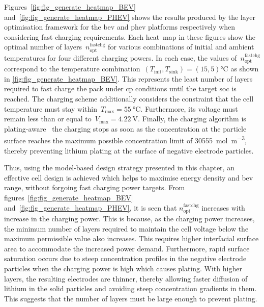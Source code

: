 Figures~\ref{fig:fig_generate_heatmap_BEV}
and~\ref{fig:fig_generate_heatmap_PHEV} shows the results  produced by the layer
optimisation framework  for the \gls{bev} and  \gls{phev} platforms respectively
when  considering fast  charging requirements.  Each heat~map  in these  figures
show  the optimal  number  of  layers~$n^\text{fastchg}_\text{opt}$ for  various
combinations of  initial and  ambient temperatures  for four  different charging
powers. In each case, the  values of~$n^\text{fastchg}_\text{opt}$ correspond to
the  temperature  combination~${(T_\text{init},T_\text{sink})  =  (15,  5)
\si{\degreeCelsius}}$  as  shown  in  \cref{fig:fig_generate_heatmap_BEV}.  This
represents the  least number of  layers required to  fast charge the  pack under
\gls{cp} conditions until  the target \gls{soc} is reached.  The charging scheme
additionally considers the constraint that the cell temperature must stay
within~${T_\text{max}=  \SI{55}{\degreeCelsius}}$. Furthermore,  its voltage 
must remain less than or equal  to~${V_\text{max} = \SI{4.22}{\volt}}$. Finally,
the charging algorithm is plating-aware \ie~the charging stops as soon as the
concentration at the particle surface reaches the maximum possible concentration
limit of \SI{30555}{\mol\per\meter\cubed}, thereby preventing  lithium plating
at the surface  of negative electrode particles.


Thus,   using    the   model-based    design   strategy   presented    in   this
chapter,   an   effective    cell   design   is   achieved    which   helps   to
maximise   energy   density  and   \gls{bev}   range,   without  forgoing   fast
charging   power    targets.   From   figures~\ref{fig:fig_generate_heatmap_BEV}
and~\ref{fig:fig_generate_heatmap_PHEV},       it       is       seen       that
$n^\text{fastchg}_\text{opt}$  increases with  increase in  the charging  power.
This is because,  as the charging power increases, the  minimum number of layers
required to maintain  the cell voltage below the maximum  permissible value also
increases.  This requires  higher interfacial  surface area  to accommodate  the
increased  power demand.  Furthermore, rapid  surface saturation  occurs due  to
steep  concentration  profiles in  the  negative  electrode particles  when  the
charging power is  high which causes plating. With higher  layers, the resulting
electrodes  are thinner,  thereby allowing  faster diffusion  of lithium  in the
solid  particles  and  avoiding  steep concentration  gradients  in  them.  This
suggests that the number of layers must be large enough to prevent plating.

